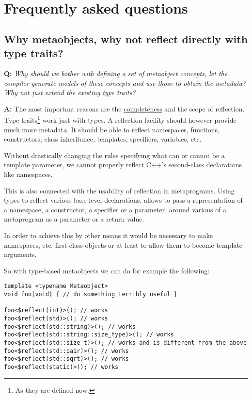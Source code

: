 \section{Frequently asked questions}

\subsection{Why metaobjects, why not reflect directly with type traits?}
\label{faq-why-metaobjects}

\textbf{Q:} {\em Why should we bother with defining a set of metaobject concepts,
let the compiler generate models of these concepts and use those to obtain
the metadata? Why not just extend the existing type traits?}

\textbf{A:} The most important reasons are the \hyperref[design-completeness]{completeness} and the scope of reflection.
Type traits\footnote{As they are defined now.} work just with types.
A reflection facility should however provide much more metadata.
It should be able to reflect namespaces, functions, constructors,
class inheritance, templates, specifiers, variables, etc.

Without drastically changing the rules specifying what can or cannot be a template
parameter, we cannot properly reflect C++'s second-class declarations like
namespaces.

This is also connected with the usability of reflection in metaprograms.
Using types to reflect various base-level declarations, allows to
pass a representation of a namespace, a constructor, a specifier or a parameter,
around various  of a metaprogram as a parameter or a return value.

In order to achieve this by other means it would be necessary to make namespaces,
etc. first-class objects or at least to allow them to become template arguments.

So with type-based metaobjects we can do for example the following:

\begin{verbatim}
template <typename Metaobject>
void foo(void) { // do something terribly useful }

foo<$reflect(int)>(); // works
foo<$reflect(std)>(); // works
foo<$reflect(std::string)>(); // works
foo<$reflect(std::string::size_type)>(); // works
foo<$reflect(std::size_t)>(); // works and is different from the above
foo<$reflect(std::pair)>(); // works
foo<$reflect(std::sqrt)>(); // works
foo<$reflect(static)>(); // works
\end{verbatim}

